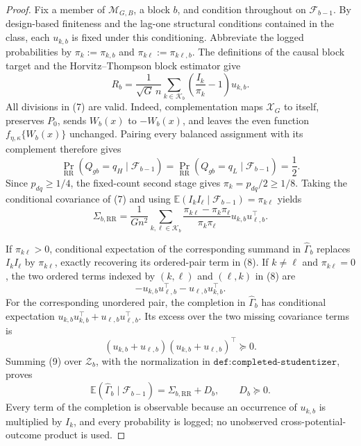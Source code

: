\documentclass{article}
\begin{document}
\begin{proof}
Fix a member of \(\mathcal M_{G,B}\), a block \(b\), and condition throughout on \(\mathcal F_{b-1}\).  By design-based finiteness and the lag-one structural conditions contained in the class, each \(u_{k,b}\) is fixed under this conditioning.  Abbreviate the logged probabilities by \(\pi_k:=\pi_{k,b}\) and \(\pi_{k\ell}:=\pi_{k\ell,b}\).  The definitions of the causal block target and the Horvitz--Thompson block estimator give
\[
 R_b=\frac1{\sqrt G\,n}\sum_{k\in\mathcal K_b}
       \left(\frac{I_k}{\pi_k}-1\right)u_{k,b}.             \tag{7}
\]
All divisions in (7) are valid.  Indeed, complementation maps \(\mathcal X_G\) to itself, preserves \(P_0\), sends \(W_b(x)\) to \(-W_b(x)\), and leaves the even function \(f_{\eta,\kappa}\{W_b(x)\}\) unchanged.  Pairing every balanced assignment with its complement therefore gives
\[
 \Pr_{\mathrm{RR}}(Q_{gb}=q_H\mid\mathcal F_{b-1})
 =\Pr_{\mathrm{RR}}(Q_{gb}=q_L\mid\mathcal F_{b-1})=\frac12.
\]
Since \(p_{dq}\geq1/4\), the fixed-count second stage gives \(\pi_k=p_{dq}/2\geq1/8\).  Taking the conditional covariance of (7) and using \(\mathbb E(I_kI_\ell\mid\mathcal F_{b-1})=\pi_{k\ell}\) yields
\[
 \Sigma_{b,\mathrm{RR}}
 =\frac1{Gn^2}\sum_{k,\ell\in\mathcal K_b}
   \frac{\pi_{k\ell}-\pi_k\pi_\ell}{\pi_k\pi_\ell}
   u_{k,b}u_{\ell,b}^\top.                                 \tag{8}
\]

If \(\pi_{k\ell}>0\), conditional expectation of the corresponding summand in \(\widehat\Gamma_b\) replaces \(I_kI_\ell\) by \(\pi_{k\ell}\), exactly recovering its ordered-pair term in (8).  If \(k\ne\ell\) and \(\pi_{k\ell}=0\), the two ordered terms indexed by \((k,\ell)\) and \((\ell,k)\) in (8) are
\[
 -u_{k,b}u_{\ell,b}^\top-u_{\ell,b}u_{k,b}^\top.
\]
For the corresponding unordered pair, the completion in \(\widehat\Gamma_b\) has conditional expectation \(u_{k,b}u_{k,b}^\top+u_{\ell,b}u_{\ell,b}^\top\).  Its excess over the two missing covariance terms is
\[
 (u_{k,b}+u_{\ell,b})(u_{k,b}+u_{\ell,b})^\top\succeq0.   \tag{9}
\]
Summing (9) over \(\mathcal Z_b\), with the normalization in \(\texttt{def:completed-studentizer}\), proves
\[
 \mathbb E(\widehat\Gamma_b\mid\mathcal F_{b-1})
 =\Sigma_{b,\mathrm{RR}}+D_b,
 \qquad D_b\succeq0.                                      \tag{10}
\]
Every term of the completion is observable because an occurrence of \(u_{k,b}\) is multiplied by \(I_k\), and every probability is logged; no unobserved cross-potential-outcome product is used.


\end{proof}
\end{document}
